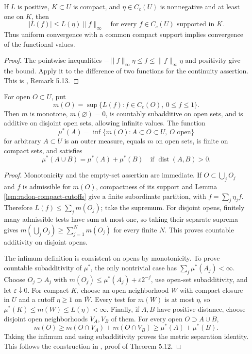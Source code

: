 \begin{lemma}\label{lem:positive-functional-local-bound}
If $L$ is positive, $K\subset U$ is compact, and $\eta\in C_c(U)$ is nonnegative and at least one on $K$, then
\[
 |L(f)|\leq L(\eta)\|f\|_\infty\quad\text{for every }f\in C_c(U)\text{ supported in }K.
\]
Thus uniform convergence with a common compact support implies convergence of the functional values.
\end{lemma}
\begin{proof}
The pointwise inequalities $-\|f\|_\infty\eta\leq f\leq\|f\|_\infty\eta$ and positivity give the bound. Apply it to the difference of two functions for the continuity assertion. This is \cite{Sim18}, Remark 5.13.
\end{proof}

\begin{proposition}\label{prop:functional-open-mass}
For open $O\subset U$, put
\[
 m(O)=\sup\{L(f):f\in C_c(O),\ 0\leq f\leq1\}.
\]
Then $m$ is monotone, $m(\varnothing)=0$, is countably subadditive on open sets, and is additive on disjoint open sets, allowing infinite values. The function
\[
 \mu^*(A)=\inf\{m(O):A\subset O\subset U,\ O\text{ open}\}
\]
for arbitrary $A\subset U$ is an outer measure, equals $m$ on open sets, is finite on compact sets, and satisfies
\[
 \mu^*(A\cup B)=\mu^*(A)+\mu^*(B)
 \quad\text{if }\operatorname{dist}(A,B)>0.
\]
\end{proposition}
\begin{proof}
Monotonicity and the empty-set assertion are immediate. If $O\subset\bigcup_jO_j$ and $f$ is admissible for $m(O)$, compactness of its support and Lemma \ref{lem:radon-compact-cutoffs} give a finite subordinate partition, with $f=\sum_j\eta_jf$. Therefore $L(f)\leq\sum_jm(O_j)$; take the supremum. For disjoint opens, finitely many admissible tests have sum at most one, so taking their separate suprema gives $m(\bigcup_jO_j)\geq\sum_{j=1}^Nm(O_j)$ for every finite $N$. This proves countable additivity on disjoint opens.

The infimum definition is consistent on opens by monotonicity. To prove countable subadditivity of $\mu^*$, the only nontrivial case has $\sum_j\mu^*(A_j)<\infty$. Choose $O_j\supset A_j$ with $m(O_j)\leq\mu^*(A_j)+\varepsilon2^{-j}$, use open-set subadditivity, and let $\varepsilon\downarrow0$. For compact $K$, choose an open neighborhood $W$ with compact closure in $U$ and a cutoff $\eta\geq1$ on $\overline W$. Every test for $m(W)$ is at most $\eta$, so $\mu^*(K)\leq m(W)\leq L(\eta)<\infty$. Finally, if $A,B$ have positive distance, choose disjoint open neighborhoods $V_A,V_B$ of them. For every open $O\supset A\cup B$,
\[
 m(O)\geq m(O\cap V_A)+m(O\cap V_B)\geq\mu^*(A)+\mu^*(B).
\]
Taking the infimum and using subadditivity proves the metric separation identity. This follows the construction in \cite{Sim18}, proof of Theorem 5.12.
\end{proof}

